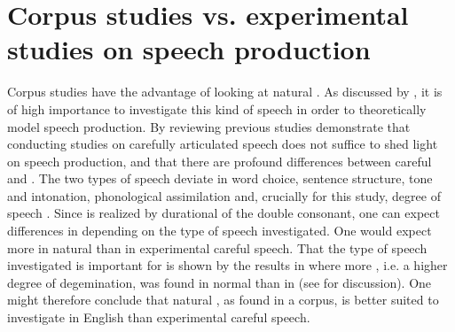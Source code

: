 \section{Corpus studies vs. experimental studies on speech production} \label{corpus and experimental studies}


Corpus studies have the advantage of looking at natural . As discussed by \cite{Tucker.2016}, it is of high importance to investigate this kind of speech in order to theoretically model speech production.  By reviewing previous studies \cite{Tucker.2016} demonstrate that conducting studies on carefully articulated speech does not suffice to shed light on speech production, and that there are profound differences between careful and . The two types of speech deviate in word choice, sentence structure, tone and intonation, phonological assimilation and, crucially for this study, degree of speech . Since  is realized by durational  of the double consonant, one can expect differences in  depending on the type of speech investigated. One would expect more  in natural  than in experimental careful speech. That the type of speech investigated is important for  is shown by the results in \cite{Oh.2012} where more , i.e. a higher degree of degemination, was found in normal than in  (see  for discussion). One might therefore conclude that natural , as found in a corpus, is better suited to investigate  in English than experimental careful speech.

